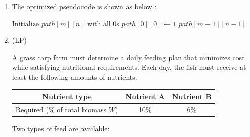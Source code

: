 \documentclass[12pt,a4paper]{article}
\makeatletter
\newtheorem*{solution}{Solution}
\theoremstyle{definition}
\renewenvironment{solution}[1][Solution] {\par\pushQED{\qed}\normalfont\topsep6\p@\@plus6\p@\relax\trivlist\item[\hskip\labelsep\bfseries#1\@addpunct{.}]\ignorespaces}{\popQED\endtrivlist\@endpefalse} \makeatother
\makeatother
\begin{document}
\begin{enumerate}
\begin{solution}
\begin{enumerate}
            \vspace{1em}
            The optimized pseudocode is shown as below :
            
            \begin{minipage}{\linewidth}
            \begin{algorithm}[H]
            \caption{Windy World Valid Paths (Tabulation)}
            \label{alg:WW_DP}
            Initialize $path[m][n]$ with all $0$s\;
            $path[0][0] \gets 1$\;
            \Return $path[m-1][n-1]$\;
            \end{algorithm}
            \end{minipage}
            
        \end{enumerate}
    \end{solution}
    \newpage
    \item {\color{purple}(LP)}

    A grass carp farm must determine a daily feeding plan that minimizes cost while satisfying nutritional requirements. Each day, the fish must receive at least the following amounts of nutrients:
    \vspace{-0.1cm}
    \begin{center}
    \begin{tabular}{|c|c|c|}
    \hline
    Nutrient type & Nutrient A & Nutrient B \\
    \hline
    Required (\% of total biomass $W$) & 10\% & 6\% \\
    \hline
    \end{tabular}
    \end{center}
    \vspace{-0.1cm}
    Two types of feed are available:
    

\end{enumerate}
\end{document}

